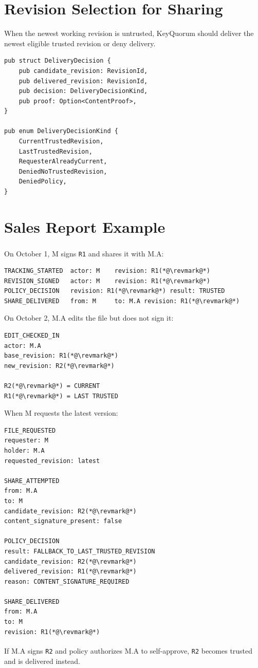 \documentclass[11pt]{article}
\newcommand{\revshort}[1]{\texttt{#1}\textsuperscript{\textcolor{revisionnote}{\dag}}}
\begin{document}
\section{Revision Selection for Sharing}
When the newest working revision is untrusted, KeyQuorum should deliver the newest eligible trusted revision or deny delivery.
\begin{lstlisting}
pub struct DeliveryDecision {
    pub candidate_revision: RevisionId,
    pub delivered_revision: RevisionId,
    pub decision: DeliveryDecisionKind,
    pub proof: Option<ContentProof>,
}

pub enum DeliveryDecisionKind {
    CurrentTrustedRevision,
    LastTrustedRevision,
    RequesterAlreadyCurrent,
    DeniedNoTrustedRevision,
    DeniedPolicy,
}
\end{lstlisting}

\section{Sales Report Example}
On October 1, M signs \revshort{R1} and shares it with M.A:
\begin{lstlisting}
TRACKING_STARTED  actor: M    revision: R1(*@\revmark@*)
REVISION_SIGNED   actor: M    revision: R1(*@\revmark@*)
POLICY_DECISION   revision: R1(*@\revmark@*) result: TRUSTED
SHARE_DELIVERED   from: M     to: M.A revision: R1(*@\revmark@*)
\end{lstlisting}

On October 2, M.A edits the file but does not sign it:
\begin{lstlisting}
EDIT_CHECKED_IN
actor: M.A
base_revision: R1(*@\revmark@*)
new_revision: R2(*@\revmark@*)

R2(*@\revmark@*) = CURRENT
R1(*@\revmark@*) = LAST TRUSTED
\end{lstlisting}

When M requests the latest version:
\begin{lstlisting}
FILE_REQUESTED
requester: M
holder: M.A
requested_revision: latest

SHARE_ATTEMPTED
from: M.A
to: M
candidate_revision: R2(*@\revmark@*)
content_signature_present: false

POLICY_DECISION
result: FALLBACK_TO_LAST_TRUSTED_REVISION
candidate_revision: R2(*@\revmark@*)
delivered_revision: R1(*@\revmark@*)
reason: CONTENT_SIGNATURE_REQUIRED

SHARE_DELIVERED
from: M.A
to: M
revision: R1(*@\revmark@*)
\end{lstlisting}
If M.A signs \revshort{R2} and policy authorizes M.A to self-approve, \revshort{R2} becomes trusted and is delivered instead.
\end{document}
